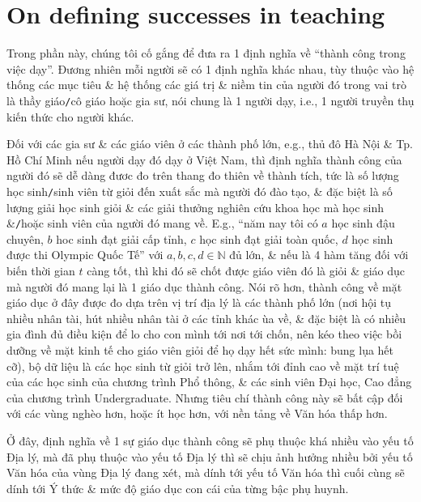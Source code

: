 \documentclass[12pt,oneside]{book}
\begin{document}
\section{On defining successes in teaching}
Trong phần này, chúng tôi cố gắng để đưa ra 1 định nghĩa về ``thành công trong việc dạy''. Đương nhiên mỗi người sẽ có 1 định nghĩa khác nhau, tùy thuộc vào hệ thống các mục tiêu \& hệ thống các giá trị \& niềm tin của người đó trong vai trò là thầy giáo{\tt/}cô giáo hoặc gia sư, nói chung là 1 người dạy, i.e., 1 người truyền thụ kiến thức cho người khác.

Đối với các gia sư \& các giáo viên ở các thành phố lớn, e.g., thủ đô Hà Nội \& Tp. Hồ Chí Minh nếu người dạy đó dạy ở Việt Nam, thì định nghĩa thành công của người đó sẽ dễ dàng đươc đo trên thang đo thiên về thành tích, tức là số lượng học sinh{\tt/}sinh viên từ giỏi đến xuất sắc mà người đó đào tạo, \& đặc biệt là số lượng giải học sinh giỏi \& các giải thưởng nghiên cứu khoa học mà học sinh \&{\tt/}hoặc sinh viên của người đó mang về. E.g., ``năm nay tôi có $a$ học sinh đậu chuyên, $b$ hoc sinh đạt giải cấp tỉnh, $c$ học sinh đạt giải toàn quốc, $d$ học sinh được thi Olympic Quốc Tế'' với $a,b,c,d\in\mathbb{N}$ đủ lớn, \& nếu là 4 hàm tăng đối với biến thời gian $t$ càng tốt, thì khi đó sẽ chốt được giáo viên đó là giỏi \& giáo dục mà người đó mang lại là 1 giáo dục thành công. Nói rõ hơn, thành công về mặt giáo dục ở đây được đo dựa trên vị trí địa lý là các thành phố lớn (nơi hội tụ nhiều nhân tài, hút nhiều nhân tài ở các tỉnh khác ùa về, \& đặc biệt là có nhiều gia đình đủ điều kiện để lo cho con mình tới nơi tới chốn, nên kéo theo việc bồi dưỡng về mặt kinh tế cho giáo viên giỏi để họ dạy hết sức mình: bung lụa hết cỡ), bộ dữ liệu là các học sinh từ giỏi trở lên, nhắm tới đỉnh cao về mặt trí tuệ của các học sinh của chương trình Phổ thông, \& các sinh viên Đại học, Cao đẳng của chương trình Undergraduate. Nhưng tiêu chí thành công này sẽ bất cập đối với các vùng nghèo hơn, hoặc ít học hơn, với nền tảng về Văn hóa thấp hơn.

Ở đây, định nghĩa về 1 sự giáo dục thành công sẽ phụ thuộc khá nhiều vào yếu tố Địa lý, mà đã phụ thuộc vào yếu tố Địa lý thì sẽ chịu ảnh hưởng nhiều bởi yếu tố Văn hóa của vùng Địa lý đang xét, mà dính tới yếu tố Văn hóa thì cuối cùng sẽ dính tới Ý thức \& mức độ giáo dục con cái của từng bậc phụ huynh.
\end{document}
